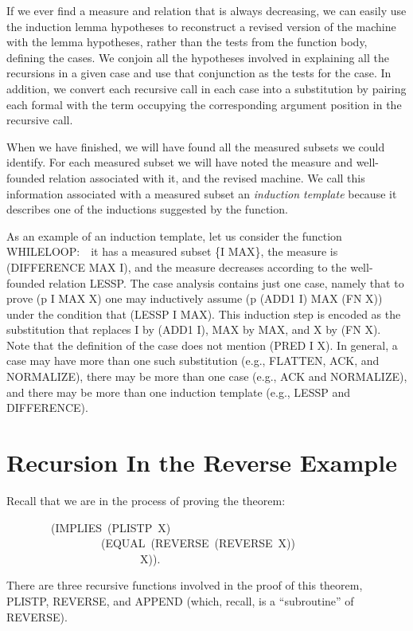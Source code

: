 \documentclass[11pt]{book}
\newenvironment{pubasis}{\begin{flushleft}\ttfamily\small}{\normalsize\rmfamily\end{flushleft}}
\newcommand{\pubinlineunderline}[1]{\emph{#1}}
\newcommand{\pubdefaulttextsize}{\large}
\begin{document}
If we ever find a measure and relation that is always decreasing, we can easily
use the induction lemma hypotheses to reconstruct a revised version of the machine
with the lemma hypotheses, rather than the tests from the function body,
defining the cases. We   conjoin all the hypotheses
involved in explaining all the recursions in a given case and use that
conjunction as the tests for the case.  In addition, we convert each recursive
call in each case into a substitution by pairing each
formal with the term occupying the corresponding argument
position in the recursive call.

When we have finished, we will have found all the measured subsets
we could identify.  For each measured subset we will have noted
the measure and well-founded relation associated with it,
and the revised machine.
We call this information associated with a measured subset
an \pubinlineunderline{induction template} because it describes one of the inductions
suggested by the function.

As an example of an induction template, let us consider the
function WHILELOOP:~~it has a measured subset \{I MAX\}, the measure
is (DIFFERENCE MAX I), and the measure decreases according to the well-founded
relation LESSP.  The case analysis contains just one case,
namely that to prove (p I MAX X) one may inductively assume (p (ADD1 I) MAX (FN X))
under the condition that (LESSP I MAX).  This induction step is
encoded as the substitution that replaces I by (ADD1 I),
MAX by MAX, and X by (FN X).  Note that the definition of the case
does not mention (PRED I X).  In general, a case may have
more than one such substitution (e.g., FLATTEN, ACK, and
NORMALIZE), there may be more than one case (e.g., ACK and NORMALIZE),
and there may be more than one induction template (e.g., LESSP and DIFFERENCE).
\section{Recursion In the Reverse Example}
\pubdefaulttextsize
Recall that we are in the process of proving the theorem:
\begin{pubasis}
~~~~~~~~(IMPLIES~(PLISTP~X)\\
~~~~~~~~~~~~~~~~~(EQUAL~(REVERSE~(REVERSE~X))\\
~~~~~~~~~~~~~~~~~~~~~~~~X)).\\
\end{pubasis}
There are three recursive functions involved in the proof of this
theorem, PLISTP, REVERSE, and APPEND (which, recall, is a ``subroutine'' of
REVERSE).
\end{document}
